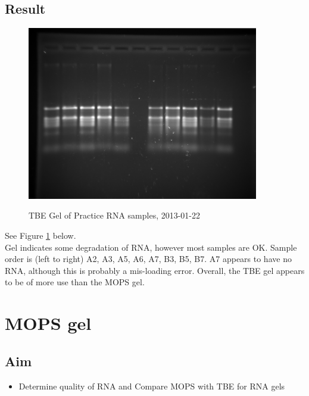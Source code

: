 \documentclass[12pt,a4paper]{book}
\begin{document}
    \subsection*{Result}
      \begin{figure}[h!]
        \caption{TBE Gel of Practice RNA samples, 2013-01-22}
        \centering
          \includegraphics[width=0.9\textwidth]{./jan/20130122-PracticeRNATBE}
        \label{fig:20130122-PracticeRNATBE}
      \end{figure}
      See Figure \ref{fig:20130122-PracticeRNATBE} below.\\
      Gel indicates some degradation of RNA, however most samples are OK. Sample order is (left to right) A2, A3, A5,
      A6, A7, B3, B5, B7. A7 appears to have no RNA, although this is probably a mis-loading error. Overall, the TBE gel
      appears to be of more use than the MOPS gel.\\

  \section*{MOPS gel}
    \subsection*{Aim}
      \begin{itemize} \itemsep1pt \parskip0pt 
        \item Determine quality of RNA and Compare MOPS with TBE for RNA gels
      \end{itemize}
\end{document}
